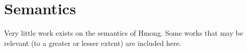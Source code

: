 \documentclass[11pt,oneside,DIV=9]{scrartcl}
\let\textitdparagraph\paragraph%
\renewcommand{\paragraph}[1]{\textitdparagraph[#1]{\makebox[1in][c]{#1:}}}
\newenvironment{entry}[1]{\hangindent=2.5em\hypertarget{#1}{\fullcite{#1}}\quoting\small}{\endquoting\medskip\par}
\begin{document}
%
%
%

\section{Semantics}

Very little work exists on the semantics of Hmong. Some works that may be relevant (to a greater or lesser extent) are included here.
\end{document}
